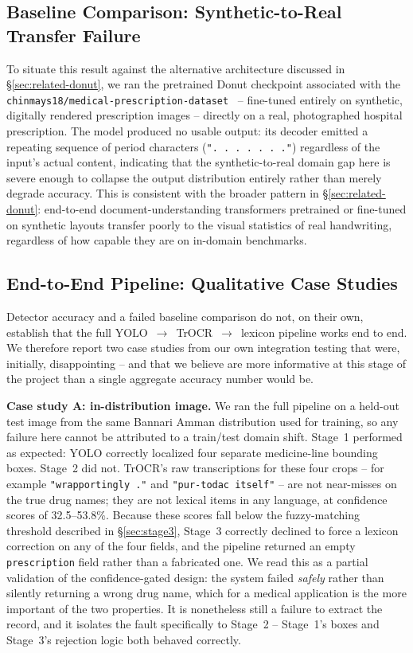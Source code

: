 \documentclass[conference]{IEEEtran}
\begin{document}
\subsection{Baseline Comparison: Synthetic-to-Real Transfer Failure}
\label{sec:baseline}

To situate this result against the alternative architecture discussed in \S\ref{sec:related-donut}, we ran the pretrained Donut checkpoint associated with the \texttt{chinmays18/medical-prescription-dataset}~\cite{shrivastava2024medocr} -- fine-tuned entirely on synthetic, digitally rendered prescription images -- directly on a real, photographed hospital prescription. The model produced no usable output: its decoder emitted a repeating sequence of period characters (\texttt{". . . . . . ."}) regardless of the input's actual content, indicating that the synthetic-to-real domain gap here is severe enough to collapse the output distribution entirely rather than merely degrade accuracy. This is consistent with the broader pattern in \S\ref{sec:related-donut}: end-to-end document-understanding transformers pretrained or fine-tuned on synthetic layouts transfer poorly to the visual statistics of real handwriting, regardless of how capable they are on in-domain benchmarks.

\subsection{End-to-End Pipeline: Qualitative Case Studies}
\label{sec:case-studies}

Detector accuracy and a failed baseline comparison do not, on their own, establish that the full YOLO~$\to$~TrOCR~$\to$~lexicon pipeline works end to end. We therefore report two case studies from our own integration testing that were, initially, disappointing -- and that we believe are more informative at this stage of the project than a single aggregate accuracy number would be.

\textbf{Case study A: in-distribution image.} We ran the full pipeline on a held-out test image from the same Bannari Amman distribution used for training, so any failure here cannot be attributed to a train/test domain shift. Stage~1 performed as expected: YOLO correctly localized four separate medicine-line bounding boxes. Stage~2 did not. TrOCR's raw transcriptions for these four crops -- for example \texttt{"wrapportingly ."} and \texttt{"pur-todac itself"} -- are not near-misses on the true drug names; they are not lexical items in any language, at confidence scores of 32.5--53.8\%. Because these scores fall below the fuzzy-matching threshold described in \S\ref{sec:stage3}, Stage~3 correctly declined to force a lexicon correction on any of the four fields, and the pipeline returned an empty \texttt{prescription} field rather than a fabricated one. We read this as a partial validation of the confidence-gated design: the system failed \emph{safely} rather than silently returning a wrong drug name, which for a medical application is the more important of the two properties. It is nonetheless still a failure to extract the record, and it isolates the fault specifically to Stage~2 -- Stage~1's boxes and Stage~3's rejection logic both behaved correctly.
\end{document}
